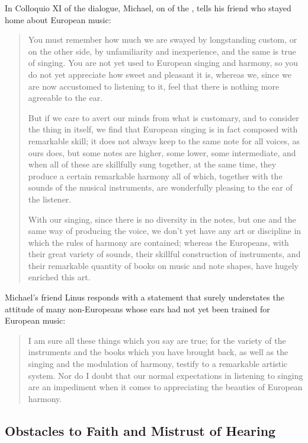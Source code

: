 In Colloquio XI of the dialogue, Michael, on of the , tells his friend who stayed home about European music:
\begin{quotation}
    You must remember \Dots{} how much we are swayed by longstanding custom, or on the other side, by unfamiliarity and inexperience, and the same is true of singing. 
    You are not yet used to European singing and harmony, so you do not yet appreciate how sweet and pleasant it is, whereas we, since we are now accustomed to listening to it, feel that there is nothing more agreeable to the ear.

    But if we care to avert our minds from what is customary, and to consider the thing in itself, we find that European singing is in fact composed with remarkable skill; it does not always keep to the same note for all voices, as ours does, but some notes are higher, some lower, some intermediate, and when all of these are skillfully sung together, at the same time, they produce a certain remarkable harmony \Dots{} all of which, \Dots{} together with the sounds of the musical instruments, are wonderfully pleasing to the ear of the listener. \Dots{}

    With our singing, since there is no diversity in the notes, but one and the same way of producing the voice, we don't yet have any art or discipline in which the rules of harmony are contained; whereas the Europeans, with their great variety of sounds, their skillful construction of instruments, and their remarkable quantity of books on music and note shapes, have hugely enriched this art.%
         \Autocite[155-156]{Massarella:JapaneseTravellers}
\end{quotation}
Michael's friend Linus responds with a statement that surely understates the attitude of many non-Europeans whose ears had not yet been trained for European music:
\begin{quote}
    I am sure all these things which you say are true; for the variety of the instruments and the books which you have brought back, as well as the singing and the modulation of harmony, testify to a remarkable artistic system.
    Nor do I doubt that our normal expectations in listening to singing are an impediment when it comes to appreciating the beauties of European harmony.%
         \Autocite[156]{Massarella:JapaneseTravellers}
\end{quote}


\subsection{Obstacles to Faith and Mistrust of Hearing}

